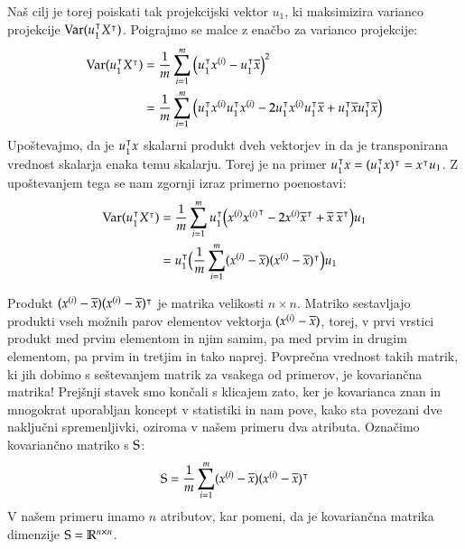 Naš cilj je torej poiskati tak projekcijski vektor $u_1$, ki maksimizira varianco projekcije $\mathrm{Var}(u_1^\intercal X^\intercal)$. Poigrajmo se malce z enačbo za varianco projekcije:
%
\begin{equation}
  \begin{split}
    \mathrm{Var}(u_1^\intercal X^\intercal)
    & = \frac{1}{m}\sum_{i=1}^m \big(u_1^\intercal x^{(i)}-u_1^\intercal\overline{x}\big)^2 \\
    & = \frac{1}{m}\sum_{i=1}^m \big(u_1^\intercal x^{(i)} u_1^\intercal x^{(i)} - 2 u_1^\intercal x^{(i)} u_1^\intercal \overline{x} + u_1^\intercal \overline{x} u_1^\intercal \overline{x} \big)
  \end{split}
\end{equation}
%
Upoštevajmo, da je $u_1^\intercal x$ skalarni produkt dveh vektorjev in da je transponirana vrednost skalarja enaka temu skalarju. Torej je na primer $u_1^\intercal x=(u_1^\intercal x)^\intercal=x^\intercal u_1$. Z upoštevanjem tega se nam zgornji izraz primerno poenostavi:
%
\begin{equation}
  \begin{split}
    \mathrm{Var}(u_1^\intercal X^\intercal)
    & = \frac{1}{m}\sum_{i=1}^m u_1^\intercal \big(x^{(i)} {x^{(i)}}^\intercal - 2 x^{(i)} \overline{x}^\intercal + \overline{x}~\overline{x}^\intercal \big) u_1 \\
    & = u_1^\intercal \big( \frac{1}{m}\sum_{i=1}^m (x^{(i)}-\overline{x}) (x^{(i)}-\overline{x})^\intercal\big) u_1
  \end{split}
\end{equation}

Produkt $(x^{(i)}-\overline{x}) (x^{(i)}-\overline{x})^\intercal$ je matrika velikosti $n\times n$. Matriko sestavljajo produkti vseh možnih parov elementov vektorja $(x^{(i)}-\overline{x})$, torej, v prvi vrstici produkt med prvim elementom in njim samim, pa med prvim in drugim elementom, pa prvim in tretjim in tako naprej. Povprečna vrednost takih matrik, ki jih dobimo s seštevanjem matrik za vsakega od primerov, je kovariančna matrika! Prejšnji stavek smo končali s klicajem zato, ker je kovarianca znan in mnogokrat uporabljan koncept v statistiki in nam pove, kako sta povezani dve naključni spremenljivki, oziroma v našem primeru dva atributa. Označimo kovariančno matriko s ${\rm S}$:
\begin{equation}
  {\rm S} = \frac{1}{m}\sum_{i=1}^m (x^{(i)}-\overline{x}) (x^{(i)}-\overline{x})^\intercal
\end{equation}
V našem primeru imamo $n$ atributov, kar pomeni, da je kovariančna matrika dimenzije ${\rm S}=\mathbb{R}^{n\times n}$.

